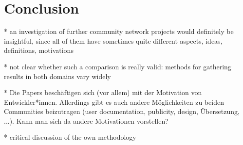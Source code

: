 \section{Conclusion}

* an investigation of further community network projects would definitely be insightful, since all of them have sometimes quite different aspects, ideas, definitions, motivations

* not clear whether such a comparison is really valid: methods for gathering results in both domains vary widely

* Die Papers beschäftigen sich (vor allem) mit der Motivation von Entwickler*innen. Allerdings gibt es auch andere Möglichkeiten zu beiden Communities beizutragen (user documentation, publicity, design, Übersetzung, ...). Kann man sich da andere Motivationen vorstellen?

* critical discussion of the own methodology
